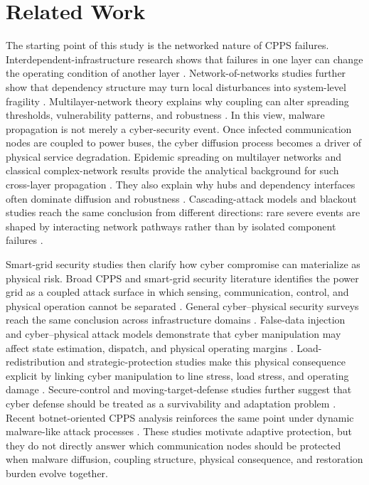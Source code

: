 \documentclass[lettersize,journal]{IEEEtran}
\begin{document}
\section{Related Work}
\label{sec:related_work}

The starting point of this study is the networked nature of CPPS failures. Interdependent-infrastructure research shows that failures in one layer can change the operating condition of another layer \cite{ouyang2014review}. Network-of-networks studies further show that dependency structure may turn local disturbances into system-level fragility \cite{vespignani2010complex,gao2012networks}. Multilayer-network theory explains why coupling can alter spreading thresholds, vulnerability patterns, and robustness \cite{kivela2014multilayer,boccaletti2014structure}. In this view, malware propagation is not merely a cyber-security event. Once infected communication nodes are coupled to power buses, the cyber diffusion process becomes a driver of physical service degradation. Epidemic spreading on multilayer networks and classical complex-network results provide the analytical background for such cross-layer propagation \cite{salehi2015spreading,barabasi1999emergence}. They also explain why hubs and dependency interfaces often dominate diffusion and robustness \cite{albert2000error,newman2003structure}. Cascading-attack models and blackout studies reach the same conclusion from different directions: rare severe events are shaped by interacting network pathways rather than by isolated component failures \cite{motter2002cascade,dobson2007complex,hines2009large}.

Smart-grid security studies then clarify how cyber compromise can materialize as physical risk. Broad CPPS and smart-grid security literature identifies the power grid as a coupled attack surface in which sensing, communication, control, and physical operation cannot be separated \cite{sridhar2012cyber,liang2017fdia}. General cyber--physical security surveys reach the same conclusion across infrastructure domains \cite{humayed2017cyber}. False-data injection and cyber--physical attack models demonstrate that cyber manipulation may affect state estimation, dispatch, and physical operating margins \cite{ten2010cybersecurity,mo2012cyber}. Load-redistribution and strategic-protection studies make this physical consequence explicit by linking cyber manipulation to line stress, load stress, and operating damage \cite{yuan2011modeling,kim2011strategic,liu2009false}. Secure-control and moving-target-defense studies further suggest that cyber defense should be treated as a survivability and adaptation problem \cite{cardenas2008secure,cho2020proactive,griffioen2021moving}. Recent botnet-oriented CPPS analysis reinforces the same point under dynamic malware-like attack processes \cite{zhao2024iotbotnet}. These studies motivate adaptive protection, but they do not directly answer which communication nodes should be protected when malware diffusion, coupling structure, physical consequence, and restoration burden evolve together.
\end{document}

